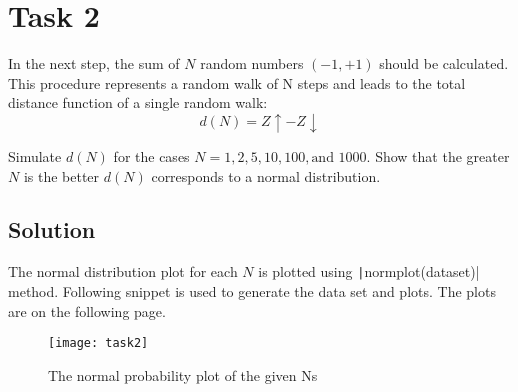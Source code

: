 \newpage
\section{Task 2}
In the next step, the sum of $N$ random numbers $(-1,+1)$ should be calculated. This procedure represents a random walk of N steps and leads to the total distance function of a single random walk:
\begin{equation}
    d(N) = Z\uparrow - Z\downarrow
\end{equation}

Simulate $d(N)$ for the cases $N = 1, 2, 5, 10, 100, \text{and }1000$. Show that the greater $N$ is the better $d(N)$ corresponds to a normal distribution.

\subsection*{Solution}
The normal distribution plot for each $N$ is plotted using \texttt|normplot(dataset)| method. Following snippet is used to generate the data set and plots. The plots are on the following page.

\begin{listing}[H]
    
\end{listing}

\begin{figure}
    \centering
    \texttt{[image: task2]}
    \caption{The normal probability plot of the given Ns}
\end{figure}
\thispagestyle{empty}
\restoregeometry

